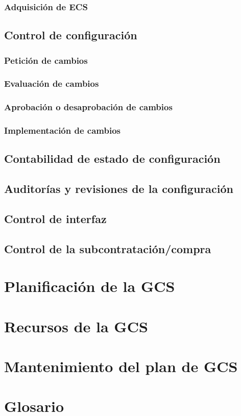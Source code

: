 \documentclass[11pt, a4paper, twoside, titlepage]{article}
\begin{document}
			\subsubsection{Adquisición de ECS}
		\subsection{Control de configuración}
			\subsubsection{Petición de cambios}
			\subsubsection{Evaluación de cambios}
			\subsubsection{Aprobación o desaprobación de cambios}
			\subsubsection{Implementación de cambios}
		\subsection{Contabilidad de estado de configuración}
		\subsection{Auditorías y revisiones de la configuración}
		\subsection{Control de interfaz}
		\subsection{Control de la subcontratación/compra}
	\section{Planificación de la GCS}
	\section{Recursos de la GCS}
	\section{Mantenimiento del plan de GCS}
	\section{Glosario}
		\printglossaries

\end{document}
